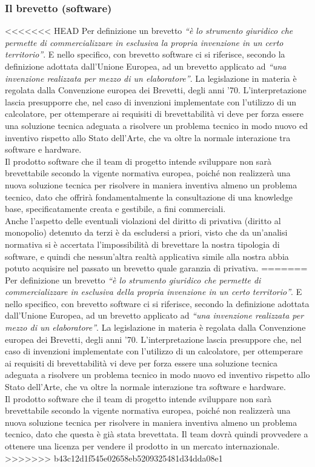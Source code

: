 \subsubsection{Il brevetto (software)}
<<<<<<< HEAD
Per definizione un brevetto \textit{``è lo strumento giuridico che permette di commercializzare in esclusiva la propria invenzione in un certo territorio''}. E nello specifico, con brevetto software ci si riferisce, secondo la definizione adottata dall'Unione Europea, ad un brevetto applicato ad \textit{``una invenzione realizzata per mezzo di un elaboratore''}. La legislazione in materia è regolata dalla Convenzione europea dei Brevetti, degli anni '70. L'interpretazione lascia presupporre che, nel caso di invenzioni implementate con l'utilizzo di un calcolatore, per ottemperare ai requisiti di brevettabilità vi deve per forza essere una soluzione tecnica adeguata a risolvere un problema tecnico in modo nuovo ed inventivo rispetto allo Stato dell'Arte, che va oltre la normale interazione tra software e hardware.\\
Il prodotto software che il team di progetto intende sviluppare non sarà brevettabile secondo la vigente normativa europea, poiché non realizzerà una nuova soluzione tecnica per risolvere in maniera inventiva almeno un problema tecnico, dato che offrirà fondamentalmente la consultazione di una knowledge base, specificatamente creata e gestibile, a fini commerciali.\\
Anche l'aspetto delle eventuali violazioni del diritto di privativa (diritto al monopolio) detenuto da terzi è da escludersi a priori, visto che da un'analisi normativa si è accertata l'impossibilità di brevettare la nostra tipologia di software, e quindi che nessun'altra realtà applicativa simile alla nostra abbia potuto acquisire nel passato un brevetto quale garanzia di privativa.
=======
Per definizione un brevetto \textit{``è lo strumento giuridico che permette di commercializzare in esclusiva della propria invenzione in un certo territorio''}. E nello specifico, con brevetto software ci si riferisce, secondo la definizione adottata dall'Unione Europea, ad un brevetto applicato ad \textit{``una invenzione realizzata per mezzo di un elaboratore''}. La legislazione in materia è regolata dalla Convenzione europea dei Brevetti, degli anni '70. L'interpretazione lascia presuppore che, nel caso di invenzioni implementate con l'utilizzo di un calcolatore, per ottemperare ai requisiti di brevettabilità vi deve per forza essere una soluzione tecnica adeguata a risolvere un problema tecnico in modo nuovo ed inventivo rispetto allo Stato dell'Arte, che va oltre la normale interazione tra software e hardware.\\
Il prodotto software che il team di progetto intende sviluppare non sarà brevettabile secondo la vigente normativa europea, poiché non realizzerà una nuova soluzione tecnica per risolvere in maniera inventiva almeno un problema tecnico, dato che questa è già stata brevettata. Il team dovrà quindi provvedere a ottenere una licenza per vendere il prodotto in un mercato internazionale. \\
>>>>>>> b43c12d1f545e02658eb5209325481d34dda08e1

